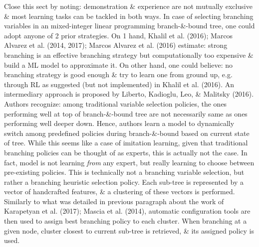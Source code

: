 \documentclass{article}
\begin{document}
\begin{itemize}
\begin{itemize}
\begin{itemize}
            Close this sect by noting: demonstration \& experience are not mutually exclusive \& most learning tasks can be tackled in both ways. In case of selecting branching variables in an mixed-integer linear programming branch-\&-bound tree, one could adopt anyone of 2 prior strategies. On 1 hand, Khalil et al. (2016); Marcos Alvarez et al. (2014, 2017); Marcos Alvarez et al. (2016) estimate: strong branching is an effective branching strategy but computationally too expensive \& build a ML model to approximate it. On other hand, one could believe: no branching strategy is good enough \& try to learn one from ground up, e.g. through RL as suggested (but not implemented) in Khalil et al. (2016). An intermediary approach is proposed by Liberto, Kadioglu, Leo, \& Malitsky (2016). Authors recognize: among traditional variable selection policies, the ones performing well at top of branch-\&-bound tree are not necessarily same as ones performing well deeper down. Hence, authors learn a model to dynamically switch among predefined policies during branch-\&-bound based on current state of tree. While this seems like a case of imitation learning, given that traditional branching policies can be thought of as experts, this is actually not the case. In fact, model is not learning {\it from} any expert, but really learning to choose between pre-existing policies. This is technically not a branching variable selection, but rather a branching heuristic selection policy. Each sub-tree is represented by a vector of handcrafted features, \& a clustering of these vectors is performed. Similarly to what was detailed in previous paragraph about the work of Karapetyan et al. (2017); Mascia et al. (2014), automatic configuration tools are then used to assign best branching policy to each cluster. When branching at a given node, cluster closest to current sub-tree is retrieved, \& its assigned policy is used.


\end{itemize}
\end{itemize}
\end{itemize}
\end{document}
